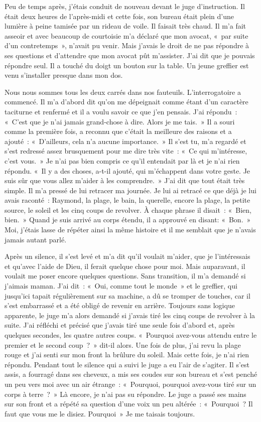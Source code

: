 \documentclass[french,twoside]{book} %
\begin{document}
Peu de temps après, j’étais conduit de nouveau devant le juge d’instruction. Il était deux heures de l’après-midi et cette fois, son bureau était plein d’une lumière à peine tamisée par un rideau de voile. Il faisait très chaud. Il m’a fait asseoir et avec beaucoup de courtoisie m’a déclaré que mon avocat, « par suite d’un contretemps », n’avait pu venir. Mais j’avais le droit de ne pas répondre à ses questions et d’attendre que mon avocat pût m’assister. J'ai dit que je pouvais répondre seul. Il a touché du doigt un bouton sur la table. Un jeune greffier est venu s’installer presque dans mon dos.\par
Nous nous sommes tous les deux carrés dans nos fauteuils. L'interrogatoire a commencé. Il m’a d’abord dit qu’on me dépeignait comme étant d’un caractère taciturne et renfermé et il a voulu savoir ce que j’en pensais. J'ai répondu : « C'est que je n’ai jamais grand-chose à dire. Alors je me tais. » Il a souri comme la première fois, a reconnu que c’était la meilleure des raisons et a ajouté : « D'ailleurs, cela n’a aucune importance. » Il s’est tu, m’a regardé et s’est redressé assez brusquement pour me dire très vite : « Ce qui m’intéresse, c’est vous. » Je n’ai pas bien compris ce qu’il entendait par là et je n’ai rien répondu. « Il y a des choses, a-t-il ajouté, qui m’échappent dans votre geste. Je suis sûr que vous allez m’aider à les comprendre. » J'ai dit que tout était très simple. Il m’a pressé de lui retracer ma journée. Je lui ai retracé ce que déjà je lui avais raconté : Raymond, la plage, le bain, la querelle, encore la plage, la petite source, le soleil et les cinq coups de revolver. À chaque phrase il disait : « Bien, bien. » Quand je suis arrivé au corps étendu, il a approuvé en disant: « Bon. » Moi, j’étais lasse de répéter ainsi la même histoire et il me semblait que je n’avais jamais autant parlé.\par
Après un silence, il s’est levé et m’a dit qu’il voulait m’aider, que je l’intéressais et qu’avec l’aide de Dieu, il ferait quelque chose pour moi. Mais auparavant, il voulait me poser encore quelques questions. Sans transition, il m’a demandé si j’aimais maman. J'ai dit : « Oui, comme tout le monde » et le greffier, qui jusqu’ici tapait régulièrement sur sa machine, a dû se tromper de touches, car il s’est embarrassé et a été obligé de revenir en arrière. Toujours sans logique apparente, le juge m’a alors demandé si j’avais tiré les cinq coups de revolver à la suite. J'ai réfléchi et précisé que j’avais tiré une seule fois d’abord et, après quelques secondes, les quatre autres coups. « Pourquoi avez-vous attendu entre le premier et le second coup ? » dit-il alors. Une fois de plus, j’ai revu la plage rouge et j’ai senti sur mon front la brûlure du soleil. Mais cette fois, je n’ai rien répondu. Pendant tout le silence qui a suivi le juge a eu l’air de s’agiter. Il s’est assis, a fourragé dans ses cheveux, a mis ses coudes sur son bureau et s’est penché un peu vers moi avec un air étrange : « Pourquoi, pourquoi avez-vous tiré sur un corps à terre ? » Là encore, je n’ai pas su répondre. Le juge a passé ses mains sur son front et a répété sa question d’une voix un peu altérée : « Pourquoi ? Il faut que vous me le disiez. Pourquoi » Je me taisais toujours.\par
\end{document}
